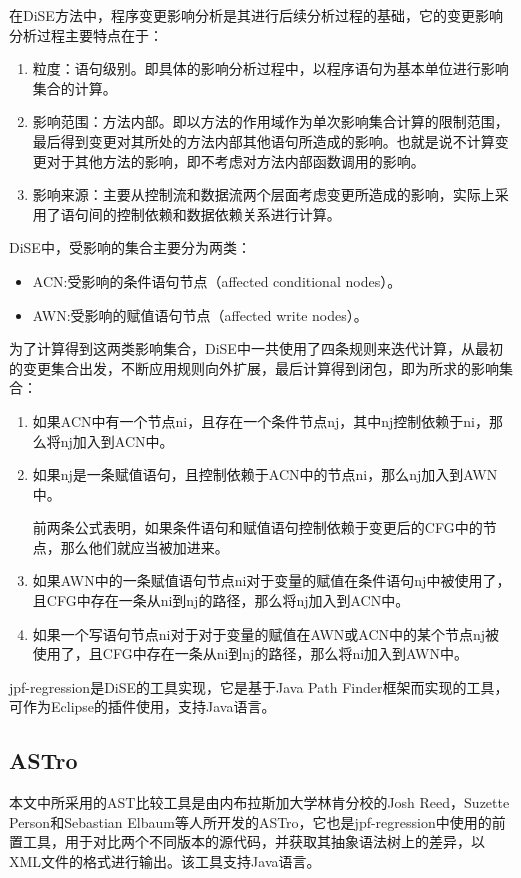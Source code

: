 在DiSE方法中，程序变更影响分析是其进行后续分析过程的基础，它的变更影响分析过程主要特点在于：
\begin{enumerate}
	\item 粒度：语句级别。即具体的影响分析过程中，以程序语句为基本单位进行影响集合的计算。
	\item 影响范围：方法内部。即以方法的作用域作为单次影响集合计算的限制范围，最后得到变更对其所处的方法内部其他语句所造成的影响。也就是说不计算变更对于其他方法的影响，即不考虑对方法内部函数调用的影响。
	\item 影响来源：主要从控制流和数据流两个层面考虑变更所造成的影响，实际上采用了语句间的控制依赖和数据依赖关系进行计算。
\end{enumerate}

DiSE中，受影响的集合主要分为两类：
\begin{itemize}
	\item ACN:受影响的条件语句节点（affected conditional nodes）。
	\item AWN:受影响的赋值语句节点（affected write nodes）。
\end{itemize}

为了计算得到这两类影响集合，DiSE中一共使用了四条规则来迭代计算，从最初的变更集合出发，不断应用规则向外扩展，最后计算得到闭包，即为所求的影响集合：
\begin{enumerate}
	\item 如果ACN中有一个节点ni，且存在一个条件节点nj，其中nj控制依赖于ni，那么将nj加入到ACN中。
	\item 如果nj是一条赋值语句，且控制依赖于ACN中的节点ni，那么nj加入到AWN中。
	     
	前两条公式表明，如果条件语句和赋值语句控制依赖于变更后的CFG中的节点，那么他们就应当被加进来。
	     
	\item 如果AWN中的一条赋值语句节点ni对于变量的赋值在条件语句nj中被使用了，且CFG中存在一条从ni到nj的路径，那么将nj加入到ACN中。

	\item 如果一个写语句节点ni对于对于变量的赋值在AWN或ACN中的某个节点nj被使用了，且CFG中存在一条从ni到nj的路径，那么将ni加入到AWN中。

\end{enumerate}

jpf-regression是DiSE的工具实现，它是基于Java Path Finder框架而实现的工具，可作为Eclipse的插件使用，支持Java语言。

\subsection{ASTro}	

	本文中所采用的AST比较工具是由内布拉斯加大学林肯分校的Josh Reed，Suzette Person和Sebastian Elbaum等人所开发的ASTro，它也是jpf-regression中使用的前置工具，用于对比两个不同版本的源代码，并获取其抽象语法树上的差异，以XML文件的格式进行输出。该工具支持Java语言。